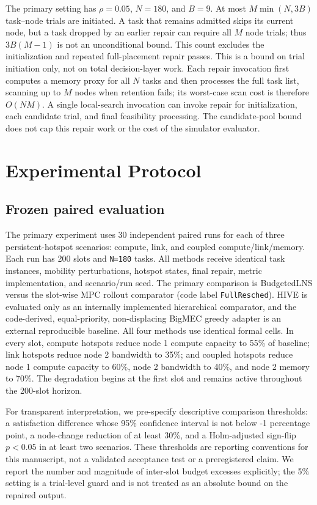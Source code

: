 \documentclass[preprint,12pt]{elsarticle}
\begin{document}
The primary setting has \(\rho=0.05\), \(N=180\), and \(B=9\).
At most \(M\min(N,3B)\) task--node trials are initiated. A task
that remains admitted skips its current node, but a task dropped by an
earlier repair can require all \(M\) node trials; thus
\(3B(M-1)\) is not an unconditional bound. This count excludes the
initialization and repeated full-placement repair passes.
This is a bound on trial initiation only, not on total decision-layer work.
Each repair invocation first computes a memory proxy for all \(N\) tasks
and then processes the full task list, scanning up to \(M\) nodes when
retention fails; its worst-case scan cost is therefore \(O(NM)\). A
single local-search invocation can invoke repair for initialization, each
candidate trial, and final feasibility processing. The candidate-pool bound
does not cap this repair work or the cost of the simulator evaluator.

\section{Experimental Protocol}\label{experimental-protocol}

\subsection{Frozen paired evaluation}\label{frozen-paired-evaluation}

The primary experiment uses 30 independent paired runs for each of three
persistent-hotspot scenarios: compute, link, and coupled
compute/link/memory. Each run has 200 slots and \texttt{N=180} tasks.
All methods receive identical task instances, mobility perturbations,
hotspot states, final repair, metric implementation, and scenario/run
seed. The primary comparison is BudgetedLNS versus the slot-wise MPC
rollout comparator (code label \texttt{FullResched}). HIVE is
evaluated only as an internally implemented hierarchical comparator, and the
code-derived, equal-priority, non-displacing BigMEC greedy adapter is an
external reproducible baseline. All four methods use identical formal
cells. In every slot, compute hotspots reduce node 1
compute capacity to 55\% of baseline; link hotspots reduce node 2
bandwidth to 35\%; and coupled hotspots reduce node 1 compute capacity
to 60\%, node 2 bandwidth to 40\%, and node 2 memory to 70\%. The
degradation begins at the first slot and remains active throughout the
200-slot horizon.

For transparent interpretation, we pre-specify descriptive comparison
thresholds: a satisfaction difference whose 95\% confidence interval is
not below -1 percentage point, a node-change reduction of at least 30\%,
and a Holm-adjusted sign-flip \(p<0.05\) in at least two scenarios. These
thresholds are reporting conventions for this manuscript, not a validated
acceptance test or a preregistered claim. We report the number and
magnitude of inter-slot budget excesses explicitly; the 5\% setting is a
trial-level guard and is not treated as an absolute bound on the repaired
output.
\end{document}
